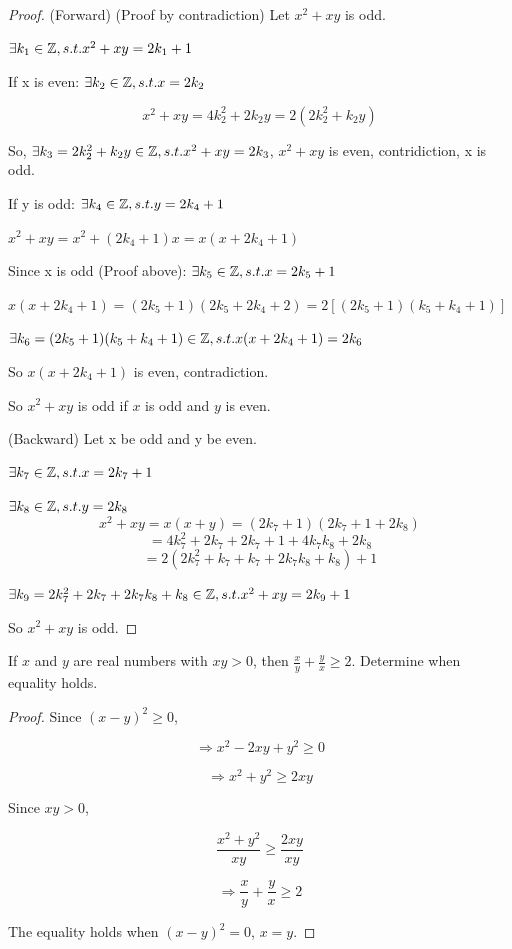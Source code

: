 \documentclass[12pt]{article}
\begin{document}
\begin{proof}
(Forward) (Proof by contradiction) Let $x^2+xy$ is odd.

$\exists k_1 \in \mathbb{Z}, s.t. x^2+xy = 2k_1+1$

If x is even:
$\exists k_2 \in \mathbb{Z}, s.t. x = 2k_2$

\[
x^2+xy = 4 k_2^2+2k_2y = 2(2k_2^2+k_2y)
\]

So, $\exists k_3=2k_2^2+k_2y \in \mathbb{Z}, s.t. x^2+xy = 2 k_3$, $x^2+xy$ is even, contridiction, x is odd.

If y is odd:
$\exists k_4 \in \mathbb{Z}, s.t. y = 2k_4 +1$

$x^2+xy= x^2+(2k_4+1)x = x(x+2k_4+1)$

Since x is odd (Proof above): 
$\exists k_5 \in \mathbb{Z}, s.t. x = 2k_5 +1$

$x(x+2k_4+1)=(2k_5+1)(2k_5+2k_4+2)=2[(2k_5+1)(k_5+k_4+1)]$

$\exists k_6= (2k_5+1)(k_5+k_4+1) \in \mathbb{Z}, s.t. x(x+2k_4+1) = 2k_6$

So $x(x+2k_4+1)$ is even, contradiction.

So $x^2 + xy$ is odd if $x$ is odd and $y$ is even. 

(Backward) Let x be odd and y be even.

$\exists k_7 \in \mathbb{Z}, s.t. x = 2k_7+1$

$\exists k_8 \in \mathbb{Z}, s.t. y = 2k_8$
\[
x^2+xy = x(x+y)=(2k_7+1)(2k_7+1+2k_8)
\]
\[
=4k_7^2+2k_7+2k_7+1+4k_7k_8+2k_8
\]
\[
=2(2k_7^2+k_7+k_7+2k_7k_8+k_8)+1
\]

$\exists k_9= 2k_7^2+2k_7+2k_7k_8+k_8\in \mathbb{Z}, s.t. x^2+xy=2k_9+1$

So $x^2+xy$ is odd. 
\end{proof}
\vfill
\begin{Lemma} If $x$ and $y$ are real numbers with $x y>0$,
then $\frac{x}{y}+\frac{y}{x} \geq 2$. Determine when equality
holds.
\end{Lemma}
\begin{proof}
Since $(x-y)^2 \geq 0$,

\[
\Rightarrow x^2-2xy+y^2 \geq 0
\]

\[
\Rightarrow x^2+y^2 \geq 2xy
\]

Since $xy>0$,

\[
\frac{x^2+y^2}{xy} \geq \frac{2xy}{xy}
\]

\[
\Rightarrow \frac{x}{y}+ \frac{y}{x}\geq 2
\]

The equality holds when $(x-y)^2=0$, $x=y$.

\end{proof}
\end{document}
